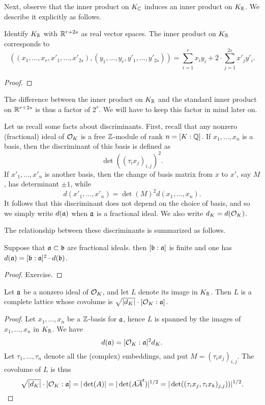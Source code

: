 Next, observe that the inner product on $K_{\mathbb{C}}$ induces an inner product on $K_{\mathbb{R}}$.
We describe it explicitly as follows.
\begin{lemma}
  Identify $K_{\mathbb{R}}$ with $\mathbb{R}^{r + 2s}$ as real vector spaces.
  The inner product on $K_{\mathbb{R}}$ corresponds to
  \[ ((x_{1},\ldots,x_{r},x'_{1},\ldots,x'_{2s}),(y_{1},\ldots,y_{r},y'_{1},\ldots,y'_{2s})) = \sum_{i = 1}^{r} x_{i} y_{i} + 2 \cdot \sum_{j = 1}^{2s} x'_{j} y'_{i}. \]
\end{lemma}
\begin{proof}
\end{proof}

The difference between the inner product on $K_{\mathbb{R}}$ and the standard inner product on $\mathbb{R}^{r + 2s}$ is thus a factor of $2^{s}$.
We will have to keep this factor in mind later on.

Let us recall some facts about discriminants.
First, recall that any nonzero (fractional) ideal of $\mathcal{O}_{K}$ is a free $\mathbb{Z}$-module of rank $n = [K:\mathbb{Q}]$.
If $x_{1},\ldots,x_{n}$ is a basis, then the discriminant of this basis is defined as
\[ \det((\tau_{i}x_{j})_{i,j})^{2}. \]
If $x'_{1},\ldots,x'_{n}$ is another basis, then the change of basis matrix from $x$ to $x'$, say $M$, has determinant $\pm 1$, while
\[ d(x'_{1},\ldots,x'_{n}) = \det(M)^{2} d(x_{1},\ldots,x_{n}). \]
It follows that this discriminant does not depend on the choice of basis, and so we simply write $d(\mathfrak{a})$ when $\mathfrak{a}$ is a fractional ideal.
We also write $d_{K} = d(\mathcal{O}_{K})$.

The relationship between these discriminants is summarized as follows.
\begin{lemma}
  Suppose that $\mathfrak{a} \subset \mathfrak{b}$ are fractional ideals.
  then $[\mathfrak{b}:\mathfrak{a}]$ is finite and one has $d(\mathfrak{a}) = [\mathfrak{b} : \mathfrak{a}]^{2} \cdot d(\mathfrak{b})$.
\end{lemma}
\begin{proof}
  Exercise.
\end{proof}

\begin{proposition}
  Let $\mathfrak{a}$ be a nonzero ideal of $\mathcal{O}_{K}$, and let $L$ denote its image in $K_{\mathbb{R}}$.
  Then $L$ is a complete lattice whose covolume is $\sqrt{|d_{K}|} \cdot [\mathcal{O}_{K}:\mathfrak{a}]$.
\end{proposition}
\begin{proof}
  Let $x_{1},\ldots,x_{n}$ be a $\mathbb{Z}$-basis for $\mathfrak{a}$, hence $L$ is spanned by the images of $x_{1},\ldots,x_{n}$ in $K_{\mathbb{R}}$.
  We have
  \[ d(\mathfrak{a}) = [\mathcal{O}_{K}:\mathfrak{a}]^{2} d_{K}. \]
  Let $\tau_{1},\ldots,\tau_{n}$ denote all the (complex) embeddings, and put $M = (\tau_{i} x_{j})_{i,j}$.
  The covolume of $L$ is thus
  \[ \sqrt{|d_{K}|} \cdot [\mathcal{O}_{K}:\mathfrak{a}] = |\det(A)| = |\det(A \overline A^{t})|^{1/2} = |\det((\tau_{i}x_{j},\tau_{i}x_{k})_{j,j}))|^{1/2}. \]
\end{proof}

